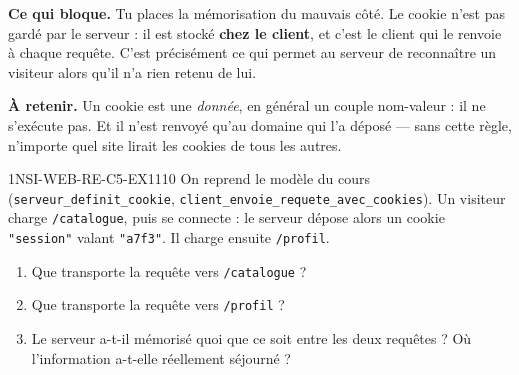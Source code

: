 

\textbf{Ce qui bloque.} Tu places la mémorisation du mauvais côté. Le cookie n'est pas gardé
par le serveur : il est stocké \textbf{chez le client}, et c'est le client qui le renvoie à
chaque requête. C'est précisément ce qui permet au serveur de reconnaître un visiteur alors
qu'il n'a rien retenu de lui.

\textbf{À retenir.} Un cookie est une \emph{donnée}, en général un couple nom-valeur : il ne
s'exécute pas. Et il n'est renvoyé qu'au domaine qui l'a déposé — sans cette règle, n'importe
quel site lirait les cookies de tous les autres.

\begin{exercice}{1NSI-WEB-RE-C5-EX1}{1}{10}
On reprend le modèle du cours (\lstinline{serveur_definit_cookie},
\lstinline{client_envoie_requete_avec_cookies}). Un visiteur charge \lstinline{/catalogue},
puis se connecte : le serveur dépose alors un cookie \lstinline{"session"} valant
\lstinline{"a7f3"}. Il charge ensuite \lstinline{/profil}.
\begin{enumerate}
  \item Que transporte la requête vers \lstinline{/catalogue} ?
  \item Que transporte la requête vers \lstinline{/profil} ?
  \item Le serveur a-t-il mémorisé quoi que ce soit entre les deux requêtes ? Où l'information
        a-t-elle réellement séjourné ?
\end{enumerate}
\end{exercice}


